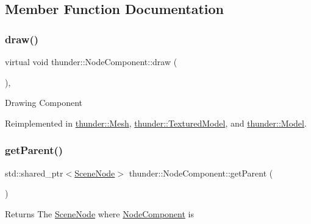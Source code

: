 \subsection{Member Function Documentation}
\mbox{\label{classthunder_1_1_node_component_a1edbd50e6595a2ad181d14683c98f405}} 
\subsubsection{\texorpdfstring{draw()}{draw()}}
{\footnotesize\ttfamily virtual void thunder\+::\+Node\+Component\+::draw (\begin{DoxyParamCaption}{ }\end{DoxyParamCaption})\hspace{0.3cm}{\ttfamily [inline]}, {\ttfamily [virtual]}}

Drawing Component 

Reimplemented in \mbox{\hyperlink{classthunder_1_1_mesh_a08bdbe48d3f9244d6b6a8edc81d34ee4}{thunder\+::\+Mesh}}, \mbox{\hyperlink{classthunder_1_1_textured_model_a20535970e84f2debb4cb2a5eabdfa93c}{thunder\+::\+Textured\+Model}}, and \mbox{\hyperlink{classthunder_1_1_model_ab85c39eee0286fb332250b46c8315c76}{thunder\+::\+Model}}.

\mbox{\label{classthunder_1_1_node_component_a09ca8c3f24e4a4e2df6b9f8e81b3504f}} 
\subsubsection{\texorpdfstring{get\+Parent()}{getParent()}}
{\footnotesize\ttfamily std\+::shared\+\_\+ptr$<$\mbox{\hyperlink{classthunder_1_1_scene_node}{Scene\+Node}}$>$ thunder\+::\+Node\+Component\+::get\+Parent (\begin{DoxyParamCaption}{ }\end{DoxyParamCaption})}

\begin{DoxyReturn}{Returns}
The \mbox{\hyperlink{classthunder_1_1_scene_node}{Scene\+Node}} where \mbox{\hyperlink{classthunder_1_1_node_component}{Node\+Component}} is 
\end{DoxyReturn}
\mbox{\label{classthunder_1_1_node_component_a9394ae349cc06fcc766d9fcfe19322fd}} 
